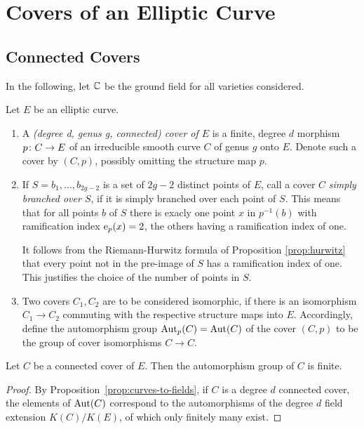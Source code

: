 \section{Covers of an Elliptic Curve}

\subsection{Connected Covers}

In the following, let $\mathbb{C}$ be the ground field for all varieties considered.

\begin{defi} Let $E$ be an elliptic curve. 
 \begin{enumerate}
  \item A \emph{(degree d, genus g, connected) cover of $E$} is a finite, degree $d$ morphism $p\colon C\to E$ of an irreducible smooth curve $C$ of genus $g$ onto $E$. Denote such a cover by $(C,p)$, possibly omitting the structure map $p$.

  \item If $S={b_1,\dotsc,b_{2g-2}}$ is a set of $2g-2$ distinct points of $E$, call a cover $C$ \emph{simply branched over $S$}, if it is simply branched over each point of $S$. This means that for all points $b$ of $S$ there is exacly one point $x$ in $p^{-1}(b)$ with ramification index $\operatorname{e}_p(x)=2$, the others having a ramification index of one.
  
  It follows from the Riemann-Hurwitz formula of Proposition \ref{prop:hurwitz} that every point not in the pre-image of $S$ has a ramification index of one. This justifies the choice of the number of points in $S$.

  \item Two covers $C_1, C_2$ are to be considered isomorphic, if there is an isomorphism $C_1\to C_2$ commuting with the respective structure maps into $E$. Accordingly, define the automorphism group $\operatorname{Aut}_p(C)=\operatorname{Aut}(C)$ of the cover $(C,p)$ to be the group of cover isomorphisms $C\to C$. 
 \end{enumerate}
\end{defi}

\begin{prop}
 Let $C$ be a connected cover of $E$. Then the automorphism group of $C$ is finite.
\end{prop}

\begin{proof}
 By Proposition~\ref{prop:curves-to-fields}, if $C$ is a degree $d$ connected cover, the elements of $\operatorname{Aut}(C)$ correspond to the automorphisms of the degree $d$ field extension $K(C)/K(E)$, of which only finitely many exist.
\end{proof}

